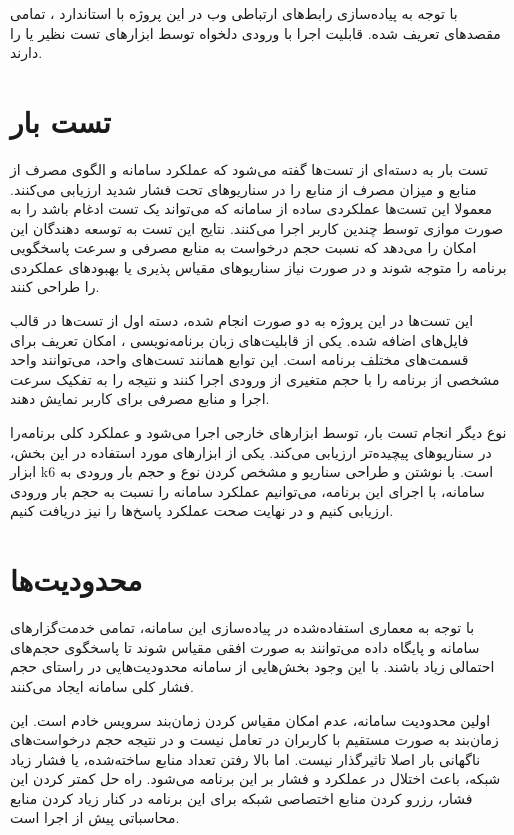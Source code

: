 با توجه به پیاده‌سازی رابط‌های ارتباطی وب در این پروژه با استاندارد ، تمامی مقصد‌های تعریف شده. قابلیت اجرا با ورودی دلخواه توسط ابزار‌های تست  نظیر  یا  را دارند.


\section{تست بار}
تست بار به دسته‌ای از تست‌ها گفته می‌شود که عملکرد سامانه و الگوی مصرف از منابع و میزان مصرف از منابع را در سناریو‌های تحت فشار شدید ارزیابی می‌کنند. معمولا این تست‌ها عملکردی ساده از سامانه که می‌تواند یک تست ادغام باشد را به صورت موازی توسط چندین کاربر اجرا می‌کنند. نتایج این تست به توسعه دهندگان این امکان را می‌دهد که نسبت حجم درخواست به منابع مصرفی و سرعت پاسخگویی برنامه را متوجه شوند و در صورت نیاز سناریو‌های مقیاس پذیری یا بهبود‌های عملکردی را طراحی کنند.

این تست‌ها در این پروژه به دو صورت انجام شده، دسته اول از تست‌ها در قالب فایل‌های  اضافه شده. یکی از قابلیت‌های زبان برنامه‌نویسی ، امکان تعریف  برای قسمت‌های مختلف برنامه است. این توابع همانند تست‌های واحد، می‌توانند واحد مشخصی از برنامه را با حجم متغیری از ورودی اجرا کنند و نتیجه را به تفکیک سرعت اجرا و منابع مصرفی برای کاربر نمایش دهند. 


نوع دیگر انجام تست بار، توسط ابزار‌های خارجی اجرا می‌شود و عملکرد کلی برنامه‌را در سناریو‌های پیچیده‌تر ارزیابی می‌کند. یکی از ابزار‌های مورد استفاده در این بخش، ابزار k6 است. با نوشتن و طراحی سناریو و مشخص کردن نوع و حجم بار ورودی به سامانه، با اجرای این برنامه، می‌توانیم عملکرد سامانه را نسبت به حجم بار ورودی ارزیابی کنیم و در نهایت صحت عملکرد پاسخ‌ها را نیز دریافت کنیم.



\section{محدودیت‌ها}
با توجه به معماری استفاده‌شده در پیاده‌سازی این سامانه، تمامی خدمت‌گزار‌های سامانه و پایگاه داده می‌توانند به صورت افقی مقیاس شوند تا پاسخگوی حجم‌های احتمالی زیاد باشند. با این وجود بخش‌هایی از سامانه محدودیت‌هایی در راستای حجم فشار کلی سامانه ایجاد می‌کنند.


اولین محدودیت سامانه، عدم امکان مقیاس کردن زمان‌بند سرویس خادم است. این زمان‌بند به صورت مستقیم با کاربران در تعامل نیست و در نتیجه حجم درخواست‌های ناگهانی بار اصلا تاثیرگذار نیست. اما بالا رفتن تعداد منابع ساخته‌شده، یا فشار زیاد شبکه، باعث اختلال در عملکرد و فشار بر این برنامه می‌شود. راه حل کمتر کردن این فشار، رزرو کردن منابع اختصاصی شبکه برای این برنامه در کنار زیاد کردن منابع محاسباتی پیش از اجرا است.

